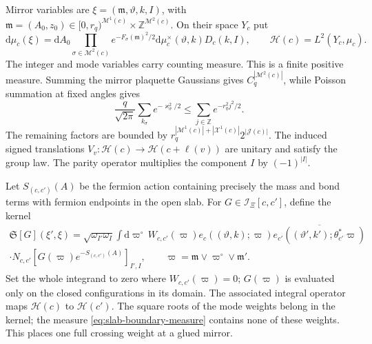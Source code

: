 \documentclass[11pt,letterpaper,reqno]{amsart}
\newcommand{\Z}{\mathbb Z}
\newcommand{\dd}{\mathrm d}
\begin{document}
Mirror variables are
$\xi=(\mathfrak m,\vartheta,k,I)$, with
$\mathfrak m=(A_0,z_0)\in[0,r_q)^{\mathcal M^1(c)}
\times\Z^{\mathcal M^2(c)}$. On their space $Y_c$ put
\begin{equation}\label{eq:slab-boundary-measure}
 \dd\mu_c(\xi)=\dd A_0
      \prod_{\sigma\in\mathcal M^2(c)}e^{-F_\sigma(\mathfrak m)^2/2}
                  \dd\mu_c^\times(\vartheta,k)D_c(k,I),
 \qquad \mathcal H(c)=L^2(Y_c,\mu_c).
\end{equation}
The integer and mode variables carry counting measure. This is a
finite positive measure. Summing the mirror plaquette Gaussians gives
$C_q^{|\mathcal M^2(c)|}$, while Poisson summation at fixed angles
gives
\[
 \frac q{\sqrt{2\pi}}\sum_{k_\sigma}e^{-\varkappa_\sigma^2/2}
 \le\sum_{j\in\Z}e^{-r_q^2j^2/2}.
\]
The remaining factors are bounded by
$r_q^{|\mathcal M^1(c)|+|\mathcal X^1(c)|}2^{|\mathcal J(c)|}$.
The induced signed translations $V_v:\mathcal H(c)\to
\mathcal H(c+\ell(v))$ are unitary and satisfy the group law. The
parity operator multiplies the component $I$ by $(-1)^{|I|}$.

Let $S_{(c,c')}(A)$ be the fermion action containing precisely the mass
and bond terms with fermion endpoints in the open slab. For
$G\in\mathcal I_\Xi[c,c']$, define the kernel
\begin{multline}\label{eq:slab-kernel}
 \mathfrak S[G](\xi',\xi)=\sqrt{\omega_{I'}\omega_I}
      \int\dd\varpi^\circ\,W_{c,c'}(\varpi)
      e_c((\vartheta,k);\varpi)
       \overline{e_{c'}((\vartheta',k');\theta_{c'}^*\varpi)}
       \\
       \cdot N_{c,c'}[G(\varpi)e^{-S_{(c,c')}(A)}]_{I',I},
       \qquad \varpi=\mathfrak m\vee\varpi^\circ\vee\mathfrak m'.
\end{multline}
Set the whole integrand to zero where $W_{c,c'}(\varpi)=0$;
$G(\varpi)$ is evaluated only on the closed configurations in its
domain.
The associated integral operator maps $\mathcal H(c)$ to
$\mathcal H(c')$. The square roots of the mode weights belong in the
kernel; the measure \eqref{eq:slab-boundary-measure} contains none of
these weights. This places one full crossing weight at a glued mirror.
\end{document}
